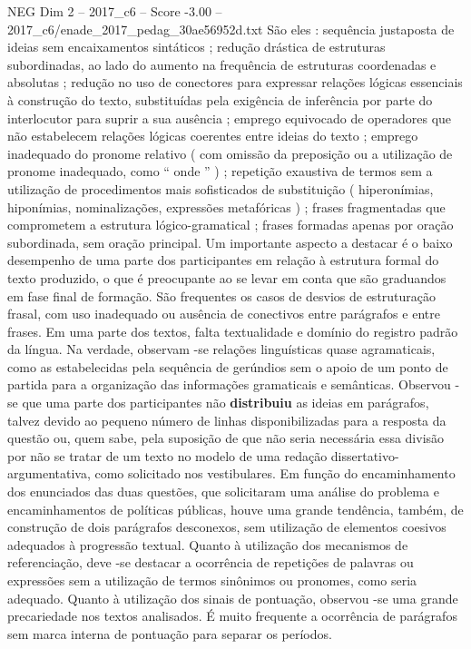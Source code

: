 \begin{textsample}{NEG Dim 2 – 2017\_c6 – Score -3.00 – 2017\_c6/enade\_2017\_pedag\_30ae56952d.txt}
São eles : sequência justaposta de ideias sem encaixamentos sintáticos ; redução drástica de estruturas subordinadas, ao lado do aumento na frequência de estruturas coordenadas e absolutas ; redução no uso de conectores para expressar relações lógicas essenciais à construção do texto, substituídas pela exigência de inferência por parte do interlocutor para suprir a sua ausência ; emprego equivocado de operadores que não estabelecem relações lógicas coerentes entre ideias do texto ; emprego inadequado do pronome relativo ( com omissão da preposição ou a utilização de pronome inadequado, como “ onde ” ) ; repetição exaustiva de termos sem a utilização de procedimentos mais sofisticados de substituição ( hiperonímias, hiponímias, nominalizações, expressões metafóricas ) ; frases fragmentadas que comprometem a estrutura lógico-gramatical ; frases formadas apenas por oração subordinada, sem oração principal.
Um importante aspecto a destacar é o baixo desempenho de uma parte dos participantes em relação à estrutura formal do texto produzido, o que é preocupante ao se levar em conta que são graduandos em fase final de formação.
São frequentes os casos de desvios de estruturação frasal, com uso inadequado ou ausência de conectivos entre parágrafos e entre frases.
Em uma parte dos textos, falta textualidade e domínio do registro padrão da língua.
Na verdade, observam -se relações linguísticas quase agramaticais, como as estabelecidas pela sequência de gerúndios sem o apoio de um ponto de partida para a organização das informações gramaticais e semânticas.
Observou -se que uma parte dos participantes não \textbf{distribuiu} as ideias em parágrafos, talvez devido ao pequeno número de linhas disponibilizadas para a resposta da questão ou, quem sabe, pela suposição de que não seria necessária essa divisão por não se tratar de um texto no modelo de uma redação dissertativo-argumentativa, como solicitado nos vestibulares.
Em função do encaminhamento dos enunciados das duas questões, que solicitaram uma análise do problema e encaminhamentos de políticas públicas, houve uma grande tendência, também, de construção de dois parágrafos desconexos, sem utilização de elementos coesivos adequados à progressão textual.
Quanto à utilização dos mecanismos de referenciação, deve -se destacar a ocorrência de repetições de palavras ou expressões sem a utilização de termos sinônimos ou pronomes, como seria adequado.
Quanto à utilização dos sinais de pontuação, observou -se uma grande precariedade nos textos analisados.
É muito frequente a ocorrência de parágrafos sem marca interna de pontuação para separar os períodos.

\end{textsample}
